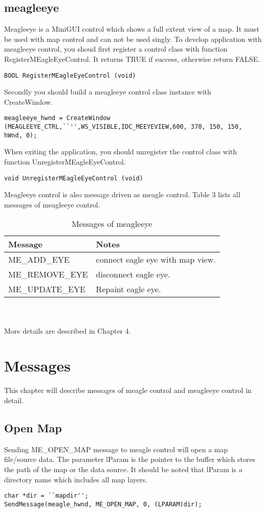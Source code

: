 \documentclass[a4paper]{article}
\begin{document}
\subsection{meagleeye}
Meagleeye is a MiniGUI control which shows a full extent view of a map. It must be used with map control and can not be used singly.
To develop application with meagleeye control, you shoud first register a control class with function RegisterMEagleEyeControl. It returns TRUE if success, otherwise return FALSE.
\begin{lstlisting}
BOOL RegisterMEagleEyeControl (void)
\end{lstlisting}

Secondly you should build a meagleeye control class instance with CreateWindow.
\begin{lstlisting}
meagleeye_hwnd = CreateWindow (MEAGLEEYE_CTRL,``'',WS_VISIBLE,IDC_MEEYEVIEW,600, 370, 150, 150, hWnd, 0);
\end{lstlisting} 
When exiting the application, you should unregister the control class with function UnregisterMEagleEyeControl.
\begin{lstlisting}
void UnregisterMEagleEyeControl (void)
\end{lstlisting}   
Meagleeye control is also message driven as meagle control. Table 3 lists all messages of meagleeye control. 
\begin{table}[h]
\centering
\caption{Messages of meagleeye}
\begin{tabular}{ll}
\hline
Message  & Notes \\[5pt] \hline
ME\_ADD\_EYE & connect eagle eye with map view. \\ 
ME\_REMOVE\_EYE  & disconnect eagle eye.   \\ 
ME\_UPDATE\_EYE & Repaint eagle eye. \\ \hline
\end{tabular}  
\end{table} \\ \\ 
More details are described in Chapter 4.

\newpage

\section{Messages}
This chapter will describe messages of meagle control and meagleeye control in detail. 
\subsection{Open Map}
Sending ME\_OPEN\_MAP message to meagle control will open a map file/source data. The parameter lParam is the pointer to the buffer which stores the path of the map or the data source. It should be noted that lParam is a directory name which includes all map layers.  
\begin{lstlisting}
char *dir = ``mapdir'';
SendMessage(meagle_hwnd, ME_OPEN_MAP, 0, (LPARAM)dir);
\end{lstlisting}
\end{document}
